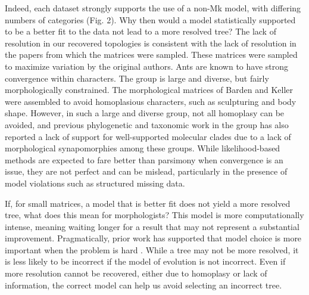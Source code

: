\documentclass[]{article}
\begin{document}
Indeed, each dataset strongly supports the use of a non-Mk model, with differing numbers of categories (Fig. 2).
Why then would a model statistically supported to be a better fit to the data not lead to a more resolved tree?
The lack of resolution in our recovered topologies is consistent with the lack of resolution in the papers from which the matrices were sampled.
These matrices were sampled to maximize variation by the original authors. 
Ants are known to have strong convergence within characters.
The group is large and diverse, but fairly morphologically constrained.
The morphological matrices of Barden and Keller were assembled to avoid homoplasious characters, such as sculpturing and body shape. 
However, in such a large and diverse group, not all homoplasy can be avoided, and previous phylogenetic and taxonomic work in the group has also reported a lack of support for well-supported molecular clades due to a lack of morphological synapomorphies among these groups. 
While likelihood-based methods are expected to fare better than parsimony when convergence is an issue, they are not perfect and can be mislead, particularly in the presence of model violations such as structured missing data.
\par
If, for small matrices, a model that is better fit does not yield a more resolved tree, what does this mean for morphologists? 
This model is more computationally intense, meaning waiting longer for a result that may not represent a substantial improvement.
Pragmatically, prior work has supported that model choice is more important when the problem is hard \citep{wright2014, Wright2016}. 
While a tree may not be more resolved, it is less likely to be incorrect if the model of evolution is not incorrect.
Even if more resolution cannot be recovered, either due to homoplasy or lack of information, the correct model can help us avoid selecting an incorrect tree.
 \par
\end{document}
